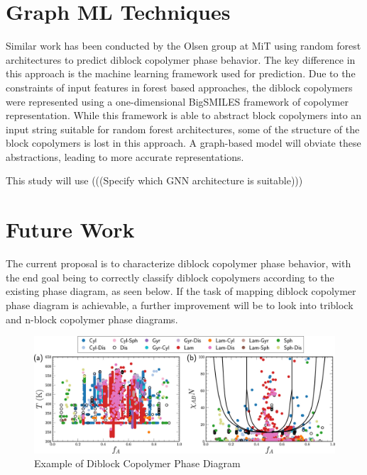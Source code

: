 \documentclass{article}
\begin{document}
\section{Graph ML Techniques}

Similar work has been conducted by the Olsen group at MiT\cite{RandForest} using random forest architectures to predict diblock copolymer phase behavior. The key difference in this approach is the machine learning framework used for prediction. Due to the constraints of input features in forest based approaches, the diblock copolymers were represented using a one-dimensional BigSMILES\cite{BigSMILES} framework of copolymer representation. While this framework is able to abstract block copolymers into an input string suitable for random forest architectures, some of the structure of the block copolymers is lost in this approach. A graph-based model will obviate these abstractions, leading to more accurate representations.

This study will use (((Specify which GNN architecture is suitable)))

\section{Future Work}
The current proposal is to characterize diblock copolymer phase behavior, with the end goal being to correctly classify diblock copolymers according to the existing phase diagram, as seen below. If the task of mapping diblock copolymer phase diagram is achievable, a further improvement will be to look into triblock and n-block copolymer phase diagrams.

\begin{figure}[h]
\caption{Example of Diblock Copolymer Phase Diagram\cite{RandForest}}
\centering
\includegraphics[width=\textwidth]{template/images_large_mz1c00521_0001.jpeg}
\end{figure}




\end{document}
